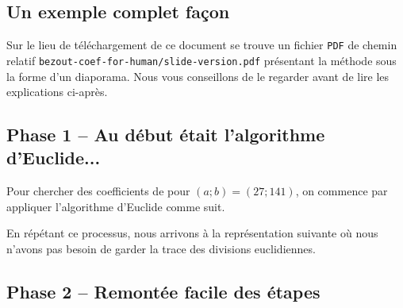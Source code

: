 \subsection{Un exemple complet façon }

Sur le lieu de téléchargement de ce document se trouve un fichier \verb+PDF+ de chemin relatif \verb+bezout-coef-for-human/slide-version.pdf+ présentant la méthode sous la forme d'un diaporama. Nous vous conseillons de le regarder avant de lire les explications ci-après.




\subsection{Phase 1 -- Au début était l'algorithme d'Euclide...}

Pour chercher des coefficients de \bb{} pour $(a ; b) = (27 ; 141)$, on commence par appliquer l'algorithme d'Euclide  comme suit.

\begin{multicols}{2}

	\columnbreak
	
\end{multicols}

\begin{multicols}{2}

	\columnbreak
	
\end{multicols}


\medskip


En répétant ce processus, nous arrivons à la représentation suivante où nous n'avons pas besoin de garder la trace des divisions euclidiennes.






\subsection{Phase 2 -- Remontée facile des étapes}

